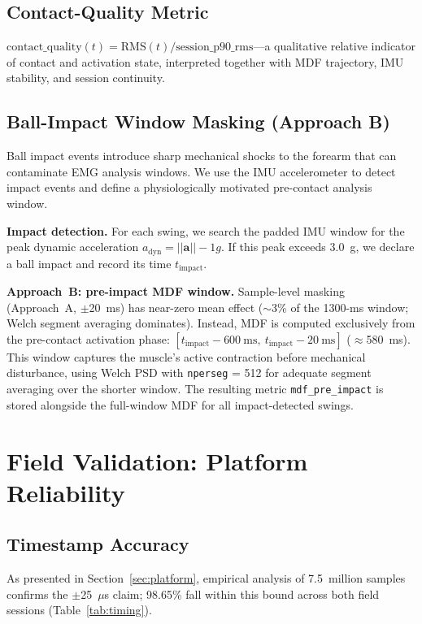 \documentclass[sensors,article,submit,pdftex,moreauthors]{Definitions/mdpi}
\begin{document}
\subsection{Contact-Quality Metric}

$\text{contact\_quality}(t) = \text{RMS}(t) / \text{session\_p90\_rms}$---a qualitative
relative indicator of contact and activation state, interpreted together with MDF
trajectory, IMU stability, and session continuity.

\subsection{Ball-Impact Window Masking (Approach B)}
\label{sec:approach_b}

Ball impact events introduce sharp mechanical shocks to the forearm that can contaminate
EMG analysis windows. We use the IMU accelerometer to detect impact events and define a
physiologically motivated pre-contact analysis window.

\textbf{Impact detection.} For each swing, we search the padded IMU window for the
peak dynamic acceleration $a_{\text{dyn}} = ||\mathbf{a}|| - 1g$. If this peak
exceeds 3.0~g, we declare a ball impact and record its time $t_{\text{impact}}$.

\textbf{Approach~B: pre-impact MDF window.} Sample-level masking (Approach~A,
$\pm$20~ms) has near-zero mean effect ($\sim$3\% of the 1300-ms window; Welch segment
averaging dominates). Instead, MDF is computed exclusively from the pre-contact
activation phase: $[t_{\text{impact}} - 600~\text{ms},\ t_{\text{impact}} - 20~\text{ms}]$
($\approx$580~ms). This window captures the muscle's active contraction before
mechanical disturbance, using Welch PSD with \texttt{nperseg} = 512 for adequate
segment averaging over the shorter window. The resulting metric \texttt{mdf\_pre\_impact}
is stored alongside the full-window MDF for all impact-detected swings.

\section{Field Validation: Platform Reliability}
\label{sec:validation}

\subsection{Timestamp Accuracy}

As presented in Section~\ref{sec:platform}, empirical analysis of 7.5~million samples
confirms the $\pm$25~$\mu$s claim; 98.65\% fall within this bound across both field
sessions (Table~\ref{tab:timing}).
\end{document}
